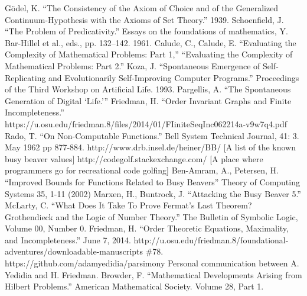 \documentclass[11pt]{article}
\begin{document}
\begin{thebibliography}{100}
 G\"odel, K. ``The Consistency of the Axiom of Choice and of the Generalized Continuum-Hypothesis with the Axioms of Set Theory.'' 1939.
 Schoenfield, J. ``The Problem of Predicativity.'' Essays on the foundations of mathematics, Y. Bar-Hillel et al., eds., pp. 132–142. 1961.
 Calude, C., Calude, E. ``Evaluating the Complexity of Mathematical Problems: Part 1,'' ``Evaluating the Complexity of Mathematical Problems: Part 2.''
 Koza, J. ``Spontaneous Emergence of Self-Replicating and Evolutionarily Self-Improving Computer Programs.'' Proceedings of the Third Workshop on Artificial Life. 1993.
 Pargellis, A. ``The Spontaneous Generation of Digital `Life.''' 
 Friedman, H. ``Order Invariant Graphs and Finite Incompleteness.'' https://u.osu.edu/friedman.8/files/2014/01/FIiniteSeqInc062214a-v9w7q4.pdf
 Rado, T. ``On Non-Computable Functions.'' 
Bell System Technical Journal, 41: 3. May 1962 pp 877-884.
 http://www.drb.insel.de/heiner/BB/ [A list of the known busy beaver values]
 http://codegolf.stackexchange.com/ [A place where programmers go for recreational code golfing]
 Ben-Amram, A., Petersen, H. ``Improved Bounds for Functions Related to Busy Beavers'' Theory of Computing Systems 35, 1-11 (2002)
 Marxen, H., Buntrock, J. ``Attacking the Busy Beaver 5.'' 
 McLarty, C. ``What Does It Take To Prove Fermat's Last Theorem? Grothendieck and the Logic of Number Theory.'' The Bulletin of Symbolic Logic, Volume 00, Number 0.
 Friedman, H. ``Order Theoretic Equations, Maximality, and Incompleteness.'' June 7, 2014. http://u.osu.edu/friedman.8/foundational-adventures/downloadable-manuscripts \#78.
 https://github.com/adamyedidia/parsimony
 Personal communication between A. Yedidia and H. Friedman.
 Browder, F. ``Mathematical Developments Arising from Hilbert Problems.'' American Mathematical Society. Volume 28, Part 1.
\end{thebibliography}
\end{document}
